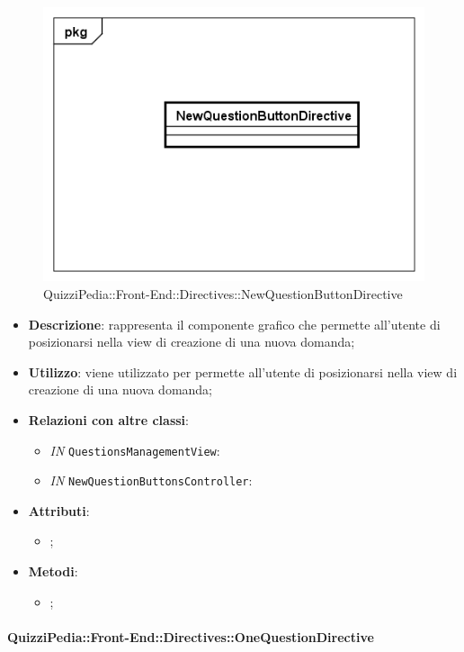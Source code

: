 \begin{figure}[h]
	\centering
	\includegraphics[scale=0.5,keepaspectratio]{UML/Classi/Front-End/QuizziPedia_Front-end_Directives_NewQuestionButtonDirective.png}
	\caption{QuizziPedia::Front-End::Directives::NewQuestionButtonDirective}
\end{figure}

\begin{itemize}
	\item \textbf{Descrizione}: rappresenta il componente grafico che permette all'utente di posizionarsi nella view di creazione di una nuova domanda;
	\item \textbf{Utilizzo}: viene utilizzato per permette all'utente di posizionarsi nella view di creazione di una nuova domanda;
	\item \textbf{Relazioni con altre classi}: 
	\begin{itemize}
		\item \textit{IN} \texttt{QuestionsManagementView}: 
		\item \textit{IN} \texttt{NewQuestionButtonsController}: 
	\end{itemize}
	\item \textbf{Attributi}: 
	\begin{itemize}
		\item ;
	\end{itemize}
	\item \textbf{Metodi}: 
	\begin{itemize}
		\item ;
	\end{itemize}
\end{itemize}

\paragraph{QuizziPedia::Front-End::Directives::OneQuestionDirective}

